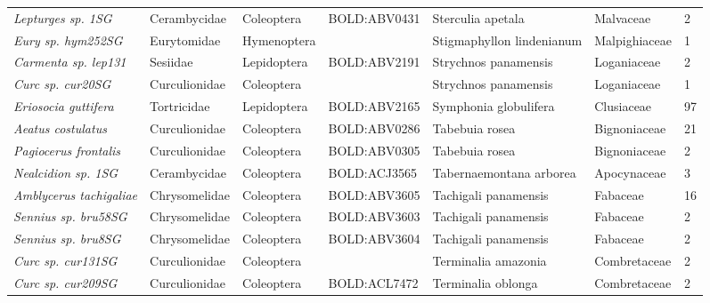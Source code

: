 \documentclass[11pt]{article}
\begin{document}
\begin{landscape}
\begin{longtable}{@{}lllllll@{}}
\textit{Lepturges sp. 1SG}                            & Cerambycidae    & Coleoptera   & BOLD:ABV0431 & Sterculia apetala                  & Malvaceae        & 2     \\
\textit{Eury sp. hym252SG}                            & Eurytomidae     & Hymenoptera  &              & Stigmaphyllon lindenianum          & Malpighiaceae    & 1     \\
\textit{Carmenta sp. lep131}                          & Sesiidae        & Lepidoptera  & BOLD:ABV2191 & Strychnos panamensis               & Loganiaceae      & 2     \\
\textit{Curc sp. cur20SG}                             & Curculionidae   & Coleoptera   &              & Strychnos panamensis               & Loganiaceae      & 1     \\
\textit{Eriosocia guttifera}                          & Tortricidae     & Lepidoptera  & BOLD:ABV2165 & Symphonia globulifera              & Clusiaceae       & 97    \\
\textit{Aeatus costulatus}                            & Curculionidae   & Coleoptera   & BOLD:ABV0286 & Tabebuia rosea                     & Bignoniaceae     & 21    \\
\textit{Pagiocerus frontalis}                         & Curculionidae   & Coleoptera   & BOLD:ABV0305 & Tabebuia rosea                     & Bignoniaceae     & 2     \\
\textit{Nealcidion sp. 1SG}                           & Cerambycidae    & Coleoptera   & BOLD:ACJ3565 & Tabernaemontana arborea            & Apocynaceae      & 3     \\
\textit{Amblycerus tachigaliae}                       & Chrysomelidae   & Coleoptera   & BOLD:ABV3605 & Tachigali panamensis               & Fabaceae         & 16    \\
\textit{Sennius sp. bru58SG}                          & Chrysomelidae   & Coleoptera   & BOLD:ABV3603 & Tachigali panamensis               & Fabaceae         & 2     \\
\textit{Sennius sp. bru8SG}                           & Chrysomelidae   & Coleoptera   & BOLD:ABV3604 & Tachigali panamensis               & Fabaceae         & 2     \\
\textit{Curc sp. cur131SG}                            & Curculionidae   & Coleoptera   &              & Terminalia amazonia                & Combretaceae     & 2     \\
\textit{Curc sp. cur209SG}                            & Curculionidae   & Coleoptera   & BOLD:ACL7472 & Terminalia oblonga                 & Combretaceae     & 2     \\

\end{longtable}
\end{landscape}
\end{document}
